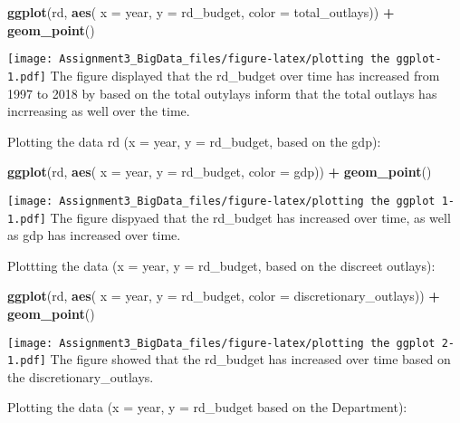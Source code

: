 \documentclass[]{article}
\newenvironment{Shaded}{\begin{snugshade}}{\end{snugshade}}
\newcommand{\KeywordTok}[1]{\textcolor[rgb]{0.13,0.29,0.53}{\textbf{#1}}}
\newcommand{\DataTypeTok}[1]{\textcolor[rgb]{0.13,0.29,0.53}{#1}}
\newcommand{\StringTok}[1]{\textcolor[rgb]{0.31,0.60,0.02}{#1}}
\newcommand{\OperatorTok}[1]{\textcolor[rgb]{0.81,0.36,0.00}{\textbf{#1}}}
\newcommand{\NormalTok}[1]{#1}
\begin{document}
\begin{Shaded}
\begin{Highlighting}[]
\KeywordTok{ggplot}\NormalTok{(rd, }\KeywordTok{aes}\NormalTok{( }\DataTypeTok{x =}\NormalTok{ year, }\DataTypeTok{y =}\NormalTok{ rd_budget, }\DataTypeTok{color =}\NormalTok{ total_outlays)) }\OperatorTok{+}
\StringTok{  }\KeywordTok{geom_point}\NormalTok{()}
\end{Highlighting}
\end{Shaded}

\texttt{[image: Assignment3\_BigData\_files/figure-latex/plotting the ggplot-1.pdf]}
The figure displayed that the rd\_budget over time has increased from
1997 to 2018 by based on the total outylays inform that the total
outlays has incrreasing as well over the time.

Plotting the data rd (x = year, y = rd\_budget, based on the gdp):

\begin{Shaded}
\begin{Highlighting}[]
\KeywordTok{ggplot}\NormalTok{(rd, }\KeywordTok{aes}\NormalTok{( }\DataTypeTok{x =}\NormalTok{ year, }\DataTypeTok{y =}\NormalTok{ rd_budget, }\DataTypeTok{color =}\NormalTok{ gdp)) }\OperatorTok{+}
\StringTok{  }\KeywordTok{geom_point}\NormalTok{()}
\end{Highlighting}
\end{Shaded}

\texttt{[image: Assignment3\_BigData\_files/figure-latex/plotting the ggplot 1-1.pdf]}
The figure dispyaed that the rd\_budget has increased over time, as well
as gdp has increased over time.

Plottting the data (x = year, y = rd\_budget, based on the discreet
outlays):

\begin{Shaded}
\begin{Highlighting}[]
\KeywordTok{ggplot}\NormalTok{(rd, }\KeywordTok{aes}\NormalTok{( }\DataTypeTok{x =}\NormalTok{ year, }\DataTypeTok{y =}\NormalTok{ rd_budget, }\DataTypeTok{color =}\NormalTok{ discretionary_outlays)) }\OperatorTok{+}
\StringTok{  }\KeywordTok{geom_point}\NormalTok{()}
\end{Highlighting}
\end{Shaded}

\texttt{[image: Assignment3\_BigData\_files/figure-latex/plotting the ggplot 2-1.pdf]}
The figure showed that the rd\_budget has increased over time based on
the discretionary\_outlays.

Plotting the data (x = year, y = rd\_budget based on the Department):
\end{document}

